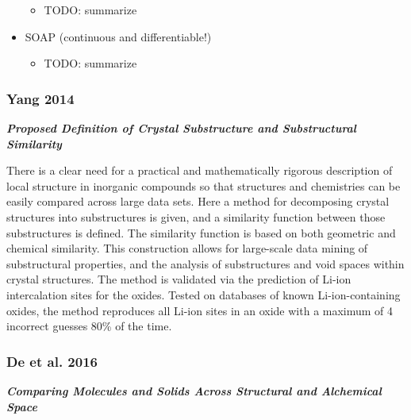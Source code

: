 \documentclass[11pt]{article}
\providecommand{\tightlist}{%
      \setlength{\itemsep}{0pt}\setlength{\parskip}{0pt}}
\begin{document}
\begin{itemize}
  \begin{itemize}
  \tightlist
  \item
    TODO: summarize
  \end{itemize}
\item
  SOAP (continuous and differentiable!)

  \begin{itemize}
  \tightlist
  \item
    TODO: summarize
  \end{itemize}
\end{itemize}

    \subsubsection{Yang 2014}\label{yang-2014}

\textbf{\emph{Proposed Definition of Crystal Substructure and
Substructural Similarity}}

There is a clear need for a practical and mathematically rigorous
description of local structure in inorganic compounds so that structures
and chemistries can be easily compared across large data sets. Here a
method for decomposing crystal structures into substructures is given,
and a similarity function between those substructures is defined. The
similarity function is based on both geometric and chemical similarity.
This construction allows for large-scale data mining of substructural
properties, and the analysis of substructures and void spaces within
crystal structures. The method is validated via the prediction of Li-ion
intercalation sites for the oxides. Tested on databases of known
Li-ion-containing oxides, the method reproduces all Li-ion sites in an
oxide with a maximum of 4 incorrect guesses 80\% of the time.

    \subsubsection{De et al. 2016}\label{de-et-al.-2016}

\textbf{\emph{Comparing Molecules and Solids Across Structural and
Alchemical Space}}
\end{document}
